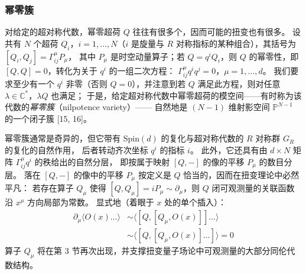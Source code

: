 \subsubsection{幂零簇}

对给定的超对称代数，幂零超荷 $Q$ 往往有很多个，因而可能的扭变也有很多。
设共有 $N$ 个超荷 $Q_i$，$i=1,\dots,N$（$i$ 是旋量与 $R$ 对称指标的某种组合），其括号为 $[Q_i,Q_j]=\Gamma^\mu_{ij}P_\mu$，
其中 $P_\mu$ 是时空动量算子；若 $Q=q^iQ_i$，则 $Q$ 的幂零性，即 $[Q,Q]=0$，转化为关于 $q^i$ 的一组二次方程：
$\Gamma^\mu_{ij}q^iq^j=0$，$\mu=1,\dots,d$。
我们要求至少有一个 $q^i$ 非零（否则 $Q=0$），并注意到若 $Q$ 满足此方程，则对任意 $\lambda\in\mathbb{C}^*$，$\lambda Q$ 也满足；
于是，给定超对称代数中幂零超荷的模空间——有时称为该代数的\emph{幂零簇}（nilpotence variety）——
自然地是 $(N-1)$ 维射影空间 $\mathbb{P}^{N-1}$ 的一个闭子簇 [15, 16]。

幂零簇通常是奇异的，但它带有 $\mathrm{Spin}(d)$ 的复化与超对称代数的 $R$ 对称群 $G_R$ 的复化的自然作用，
后者转动齐次坐标 $q^i$ 的指标 $i$。
此外，它还具有由 $d\times N$ 矩阵 $\Gamma^\mu_{ij}q^i$ 的秩给出的自然分层，
即按属于映射 $[Q,-]$ 的像的平移 $P_\mu$ 的数目分层。
落在 $[Q,-]$ 的像中的平移 $P_\mu$ 按定义是 $Q$ 恰当的，因而在扭变理论中必然平凡：
若存在算子 $Q_\mu$ 使得 $[Q,Q_\mu]=iP_\mu\sim\partial_\mu$，则 $Q$ 闭可观测量的关联函数沿 $x^\mu$ 方向局部为常数。
显式地（着眼于 $x$ 处的单个插入）：
\begin{equation}\tag{2.2}
\begin{aligned}
\partial_\mu\langle O(x)\dots\rangle &\sim \langle [Q,[Q_\mu,O(x)]]\dots\rangle\\
&\sim \langle [Q,[Q_\mu,O(x)]\dots]\rangle=0
\end{aligned}
\end{equation}
算子 $Q_\mu$ 将在第 3 节再次出现，并支撑扭变量子场论中可观测量的大部分同伦代数结构。

